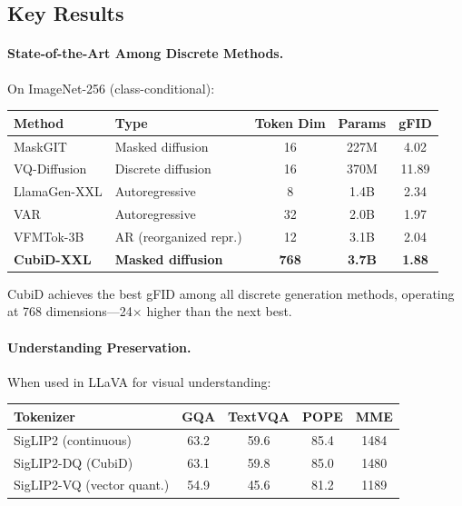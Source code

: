 \documentclass[11pt]{article}
\begin{document}
\subsection{Key Results}

\paragraph{State-of-the-Art Among Discrete Methods.}
On ImageNet-256 (class-conditional):

\begin{center}
\begin{tabular}{llccc}
\toprule
\textbf{Method} & \textbf{Type} & \textbf{Token Dim} & \textbf{Params} & \textbf{gFID} \\
\midrule
MaskGIT & Masked diffusion & 16 & 227M & 4.02 \\
VQ-Diffusion & Discrete diffusion & 16 & 370M & 11.89 \\
LlamaGen-XXL & Autoregressive & 8 & 1.4B & 2.34 \\
VAR & Autoregressive & 32 & 2.0B & 1.97 \\
VFMTok-3B & AR (reorganized repr.) & 12 & 3.1B & 2.04 \\
\textbf{CubiD-XXL} & \textbf{Masked diffusion} & \textbf{768} & \textbf{3.7B} & \textbf{1.88} \\
\bottomrule
\end{tabular}
\end{center}

CubiD achieves the best gFID among all discrete generation methods, operating at 768 dimensions---24$\times$ higher than the next best.

\paragraph{Understanding Preservation.}
When used in LLaVA for visual understanding:

\begin{center}
\begin{tabular}{lcccc}
\toprule
\textbf{Tokenizer} & \textbf{GQA} & \textbf{TextVQA} & \textbf{POPE} & \textbf{MME} \\
\midrule
SigLIP2 (continuous) & 63.2 & 59.6 & 85.4 & 1484 \\
SigLIP2-DQ (CubiD) & 63.1 & 59.8 & 85.0 & 1480 \\
SigLIP2-VQ (vector quant.) & 54.9 & 45.6 & 81.2 & 1189 \\
\bottomrule
\end{tabular}
\end{center}
\end{document}
